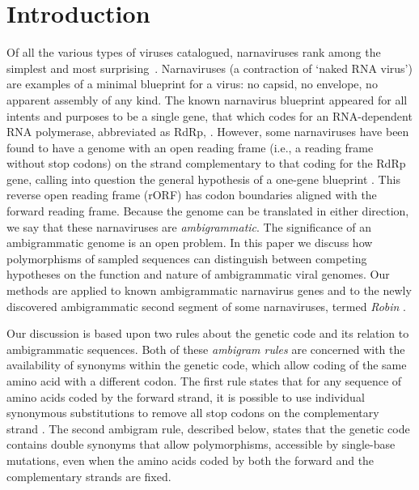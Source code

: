 \documentclass[unnumsec,webpdf,contemporary,large]{oup-authoring-template}%
\theoremstyle{thmstyleone}%
\theoremstyle{thmstyletwo}%
\theoremstyle{thmstylethree}%
\begin{document}
\maketitle


\section{Introduction}
\label{sec: 1}
Of all the various types of viruses catalogued, narnaviruses rank among the simplest
and most surprising~\citep{Cob+16}. Narnaviruses (a contraction of \lq naked RNA virus')
are examples of a minimal blueprint for a virus: no capsid, no envelope, no apparent
assembly of any kind. The known narnavirus blueprint appeared for all intents and purposes
to be a single gene, that which codes for an RNA-dependent RNA polymerase,
abbreviated as RdRp, \citep{Hillman2013}. However, some narnaviruses
have been found to have a genome with an open reading frame (i.e., a reading frame without
stop codons) on the strand complementary to that coding for the RdRp gene, calling into
question the general hypothesis of a one-gene blueprint \citep{Cook2013,DeR+19,Din+20,Cep20}.
This reverse open reading frame (rORF) has codon boundaries aligned with the forward reading
frame. Because the genome can be translated in either direction, we say that these narnaviruses
are \emph{ambigrammatic}. The significance of an ambigrammatic genome is an open problem.
In this paper we discuss how polymorphisms of sampled sequences can distinguish
between competing hypotheses on the function and nature of ambigrammatic viral genomes.
Our methods are applied to known ambigrammatic narnavirus genes and to the newly
discovered ambigrammatic second segment of some narnaviruses, termed \emph{Robin} \citep{Bat+20}.

Our discussion is based upon two rules about the genetic code and its relation to ambigrammatic
sequences. Both of these \emph{ambigram rules} are concerned with the availability of synonyms within
the genetic code, which allow coding of the same amino acid with a different codon.
The first rule states that for any sequence of amino acids coded by the forward strand,
it is possible to use individual synonymous substitutions to remove
all stop codons on the complementary strand \citep[this result was discussed already in][]{DeR+19}.
The second ambigram rule, described below, states that the genetic code contains double
synonyms that allow polymorphisms, accessible by single-base mutations, even when the
amino acids coded by both the forward and the complementary strands are fixed.
\end{document}
